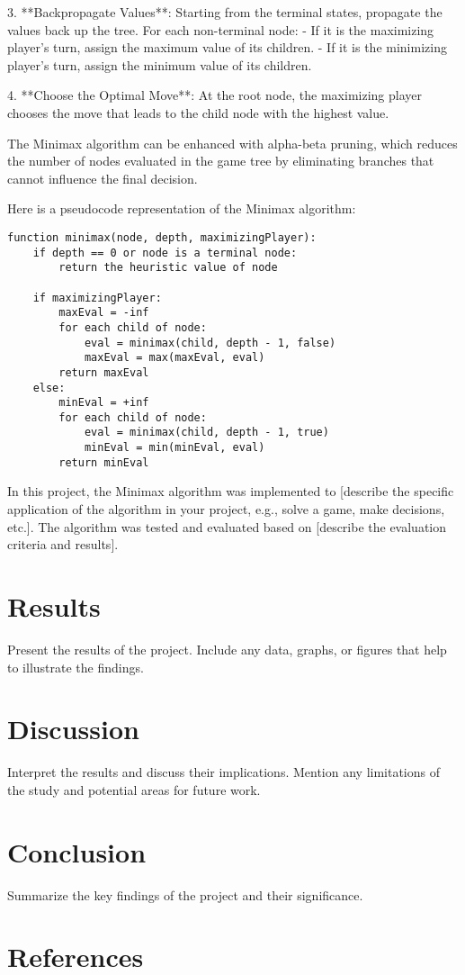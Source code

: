 \documentclass[a4paper,12pt]{article}
\begin{document}
3. **Backpropagate Values**: Starting from the terminal states, propagate the values back up the tree. For each non-terminal node:
   - If it is the maximizing player's turn, assign the maximum value of its children.
   - If it is the minimizing player's turn, assign the minimum value of its children.

4. **Choose the Optimal Move**: At the root node, the maximizing player chooses the move that leads to the child node with the highest value.

The Minimax algorithm can be enhanced with alpha-beta pruning, which reduces the number of nodes evaluated in the game tree by eliminating branches that cannot influence the final decision.

Here is a pseudocode representation of the Minimax algorithm:

\begin{verbatim}
function minimax(node, depth, maximizingPlayer):
    if depth == 0 or node is a terminal node:
        return the heuristic value of node

    if maximizingPlayer:
        maxEval = -inf
        for each child of node:
            eval = minimax(child, depth - 1, false)
            maxEval = max(maxEval, eval)
        return maxEval
    else:
        minEval = +inf
        for each child of node:
            eval = minimax(child, depth - 1, true)
            minEval = min(minEval, eval)
        return minEval
\end{verbatim}

In this project, the Minimax algorithm was implemented to [describe the specific application of the algorithm in your project, e.g., solve a game, make decisions, etc.]. The algorithm was tested and evaluated based on [describe the evaluation criteria and results].

\section{Results}
Present the results of the project. Include any data, graphs, or figures that help to illustrate the findings.

\section{Discussion}
Interpret the results and discuss their implications. Mention any limitations of the study and potential areas for future work.

\section{Conclusion}
Summarize the key findings of the project and their significance.

\section{References}


\end{document}
